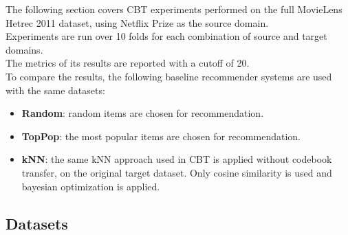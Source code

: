 The following section covers CBT experiments performed on the full MovieLens Hetrec 2011 dataset, using Netflix Prize as the source domain.\\
Experiments are run over 10 folds for each combination of source and target domains.\\
The metrics of its results are reported with a cutoff of 20.\\
To compare the results, the following baseline recommender systems are used with the same datasets:
\begin{itemize}
\item \textbf{Random}: random items are chosen for recommendation.
\item \textbf{TopPop}: the most popular items are chosen for recommendation.
\item \textbf{kNN}: the same kNN approach used in CBT is applied without codebook transfer, on the original target dataset. Only cosine similarity is used and bayesian optimization is applied.
\end{itemize}


\subsection{Datasets}

